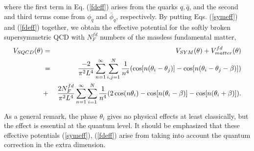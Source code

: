 \documentclass[a4paper,12pt]{article}
\begin{document}
where the first term in Eq. (\ref{fdeff}) arises from the 
quarks $q, {\bar q}$, and the
second and third terms come from $\phi_q$ and ${\bar\phi}_q$, respectively.
By putting Eqs. (\ref{symeff}) and (\ref{fdeff}) 
together, we obtain the effective potential for 
the softly broken supersymmetric QCD with $N_F^{fd}$
numbers of the massless fundamental matter,
\begin{eqnarray}   
V_{SQCD}(\theta)&=&V_{SYM}(\theta)+V_{matter}^{fd}(\theta)\nonumber\\
&=&{{-2}\over {\pi^2L^4}}
\sum_{n=1}^{\infty}\sum_{i,j=1}^{N}{1\over n^4}(\cos[n(\theta_i-\theta_j)]
-\cos[n(\theta_i-\theta_j-\beta)])\nonumber\\
&+&{{2N_F^{fd}}\over{\pi^2L^4}}\sum_{n=1}^{\infty}
\sum_{i=1}^{N}{1\over n^4}(2\cos(n\theta_i)-\cos[n(\theta_i-\beta)]
-\cos[n(\theta_i+\beta)]).
\label{sqcdeff}
\end{eqnarray}
\par
As a general remark, the phase $\theta_i$ gives no physical 
effects at least classically, but the effect is essential at 
the quantum level. It should be emphasized that these effective 
potentials (\ref{symeff}), (\ref{fdeff})
arise from taking into account the quantum correction 
in the extra dimension.
\end{document}
